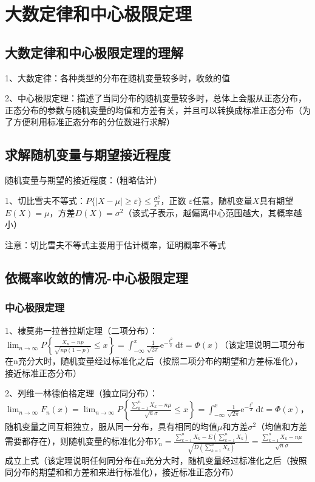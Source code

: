 \chapter{大数定律和中心极限定理}

\section{大数定律和中心极限定理的理解}

1、大数定律：各种类型的分布在随机变量较多时，收敛的值

2、中心极限定理：描述了当同分布的随机变量较多时，总体上会服从正态分布，正态分布的参数与随机变量的均值和方差有关，并且可以转换成标准正态分布（为了方便利用标准正态分布的分位数进行求解）

\section{求解随机变量与期望接近程度}

随机变量与期望的接近程度：（粗略估计）

1、切比雪夫不等式：$ P\{|X-\mu| \geqslant \varepsilon\} \leqslant \frac{\sigma^{2}}{\varepsilon^{2}} $，正数 $ \varepsilon $任意，随机变量$ X $具有期望$ E(X)=\mu $，方差$ D(X)=\sigma^{2} $（该式子表示，越偏离中心范围越大，其概率越小）

注意：切比雪夫不等式主要用于估计概率，证明概率不等式

\section{依概率收敛的情况-中心极限定理}



\subsection{中心极限定理}

1、棣莫弗一拉普拉斯定理（二项分布）：$ \lim _{n \rightarrow \infty} P\left\{\frac{X_{n}-n p}{\sqrt{n p(1-p)}} \leqslant x\right\}=\int_{-\infty}^{x} \frac{1}{\sqrt{2 \pi}} \mathrm{e}^{-\frac{t^{2}}{2}} \mathrm{~d} t=\Phi(x) $（该定理说明二项分布在n充分大时，随机变量经过标准化之后（按照二项分布的期望和方差标准化），接近标准正态分布）

2、列维一林德伯格定理（独立同分布）：$ \lim_{n \rightarrow \infty} F_{n}(x)=\lim_{n \rightarrow \infty} P\left\{\frac{\sum_{k=1}^{n} X_{k}-n \mu}{\sqrt{n} \sigma} \leqslant x\right\}=\int_{-\infty}^{x} \frac{1}{\sqrt{2 \pi}} \mathrm{e}^{-\frac{t^{2}}{2}} \mathrm{~d} t=\Phi(x) $，随机变量之间互相独立，服从同一分布，具有相同的均值$ \mu $和方差$ \sigma^2 $（均值和方差需要都存在），则随机变量的标准化分布$ Y_{n}=\frac{\sum_{k=1}^{n} X_{k}-E\left(\sum_{k=1}^{n} X_{k}\right)}{\sqrt{D\left(\sum_{k=1}^{n} X_{k}\right)}}=\frac{\sum_{k=1}^{n} X_{k}-n \mu}{\sqrt{n} \sigma} $成立上式（该定理说明任何同分布在n充分大时，随机变量经过标准化之后（按照同分布的期望和和方差和来进行标准化），接近标准正态分布）




